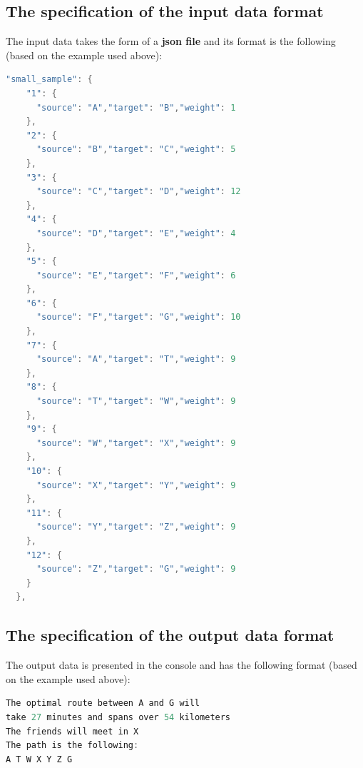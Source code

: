 \documentclass[12pt]{article}
\begin{document}
\subsection{The specification of the input data format}
The input data takes the form of a \textbf{json file} and its format is the following (based on the example used above):
\begin{lstlisting}[language=C]
  "small_sample": {
    "1": {
      "source": "A","target": "B","weight": 1
    },
    "2": {
      "source": "B","target": "C","weight": 5
    },
    "3": {
      "source": "C","target": "D","weight": 12
    },
    "4": {
      "source": "D","target": "E","weight": 4
    },
    "5": {
      "source": "E","target": "F","weight": 6
    },
    "6": {
      "source": "F","target": "G","weight": 10
    },
    "7": {
      "source": "A","target": "T","weight": 9
    },
    "8": {
      "source": "T","target": "W","weight": 9
    },
    "9": {
      "source": "W","target": "X","weight": 9
    },
    "10": {
      "source": "X","target": "Y","weight": 9
    },
    "11": {
      "source": "Y","target": "Z","weight": 9
    },
    "12": {
      "source": "Z","target": "G","weight": 9
    }
  },

\end{lstlisting}
\newpage
\subsection{The specification of the output data format}
The output data is presented in the console and has 
the following format (based on the example used above):
\begin{lstlisting}[language=C]
The optimal route between A and G will 
take 27 minutes and spans over 54 kilometers
The friends will meet in X
The path is the following:
A T W X Y Z G 
\end{lstlisting}
\end{document}
